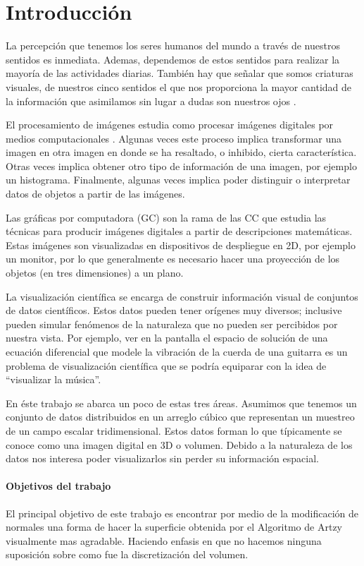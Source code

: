 \chapter*{Introducción}

La percepción que tenemos los seres humanos del mundo a través de nuestros sentidos es inmediata. Ademas, dependemos de estos sentidos para realizar la mayoría de las actividades diarias. También hay que señalar que somos criaturas visuales, de nuestros cinco sentidos el que nos proporciona la mayor cantidad de la información que asimilamos sin lugar a dudas son nuestros ojos \cite{Hagen:vista}.

El procesamiento de imágenes estudia como procesar imágenes digitales por medios computacionales \cite{Gonzalez:ImagenesDigitales}. Algunas veces este proceso implica transformar una imagen en otra imagen en donde se ha resaltado, o inhibido, cierta característica. Otras veces implica obtener otro tipo de información de una imagen, por ejemplo un histograma. Finalmente, algunas veces implica poder distinguir o interpretar datos de objetos a partir de las imágenes.

Las gráficas por computadora (GC) son la rama de las CC que estudia las técnicas para producir imágenes digitales a partir de descripciones matemáticas. Estas imágenes son visualizadas en dispositivos de despliegue en 2D, por ejemplo un monitor, por lo que generalmente es necesario hacer una proyección de los objetos (en tres dimensiones) a un plano.

La visualización científica se encarga de construir información visual de conjuntos de datos científicos. Estos datos pueden tener orígenes muy diversos; inclusive pueden simular fenómenos de la naturaleza que no pueden ser percibidos por nuestra vista. Por ejemplo, ver en la pantalla el espacio de solución de una ecuación diferencial que modele la vibración de la cuerda de una guitarra es un problema de visualización científica que se podría equiparar con la idea de ``visualizar la música''.

En éste trabajo se abarca un poco de estas tres áreas. Asumimos que tenemos un conjunto de datos distribuidos en un arreglo cúbico que representan un muestreo de un campo escalar tridimensional. Estos datos forman lo que típicamente se conoce como una imagen digital en 3D o volumen. Debido a la naturaleza de los datos nos interesa poder visualizarlos sin perder su información espacial.

\subsubsection*{Objetivos del trabajo}

El principal objetivo de este trabajo es encontrar por medio de la modificación de normales una forma de hacer la superficie obtenida por el Algoritmo de Artzy visualmente mas agradable. Haciendo enfasis en que no hacemos ninguna suposición sobre como fue la discretización del volumen.
